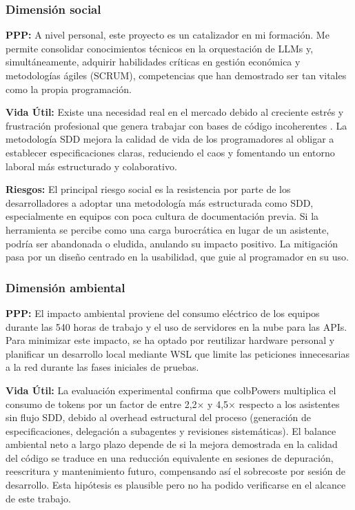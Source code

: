 \documentclass[11pt, letterpaper]{article}
\begin{document}
\subsubsection{Dimensión social}
\label{sec:dimension_social}
\textbf{PPP:} A nivel personal, este proyecto es un catalizador en mi formación. Me permite consolidar conocimientos técnicos en la orquestación de LLMs y, simultáneamente, adquirir habilidades críticas en gestión económica y metodologías ágiles (SCRUM), competencias que han demostrado ser tan vitales como la propia programación.

\textbf{Vida Útil:} Existe una necesidad real en el mercado debido al creciente estrés y frustración profesional que genera trabajar con bases de código incoherentes \cite{burnout_swe_2022}. La metodología SDD mejora la calidad de vida de los programadores al obligar a establecer especificaciones claras, reduciendo el caos y fomentando un entorno laboral más estructurado y colaborativo.

\textbf{Riesgos:} El principal riesgo social es la resistencia por parte de los desarrolladores a adoptar una metodología más estructurada como SDD, especialmente en equipos con poca cultura de documentación previa. Si la herramienta se percibe como una carga burocrática en lugar de un asistente, podría ser abandonada o eludida, anulando su impacto positivo. La mitigación pasa por un diseño centrado en la usabilidad, que guie al programador en su uso.

\subsubsection{Dimensión ambiental}
\label{sec:dimension_ambiental}
\textbf{PPP:} El impacto ambiental proviene del consumo eléctrico de los equipos durante las 540 horas de trabajo y el uso de servidores en la nube para las APIs. Para minimizar este impacto, se ha optado por reutilizar hardware personal y planificar un desarrollo local mediante WSL que limite las peticiones innecesarias a la red durante las fases iniciales de pruebas.

\textbf{Vida Útil:} La evaluación experimental confirma que colbPowers multiplica el consumo de tokens por un factor de entre 2{,}2× y 4{,}5× respecto a los asistentes sin flujo SDD, debido al overhead estructural del proceso (generación de especificaciones, delegación a subagentes y revisiones sistemáticas). El balance ambiental neto a largo plazo depende de si la mejora demostrada en la calidad del código se traduce en una reducción equivalente en sesiones de depuración, reescritura y mantenimiento futuro, compensando así el sobrecoste por sesión de desarrollo. Esta hipótesis es plausible pero no ha podido verificarse en el alcance de este trabajo.
\end{document}
